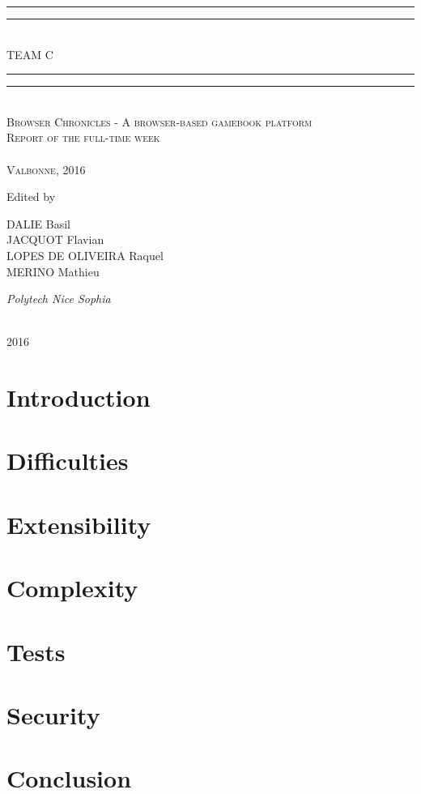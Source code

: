 \documentclass[12pt]{book}
\newcommand*{\titleGP}{\begingroup %
\centering %
\vspace*{\baselineskip} %

\rule{\textwidth}{1.6pt}\vspace*{-\baselineskip}\vspace*{2pt} %
\rule{\textwidth}{0.4pt}\\[\baselineskip] %

{\LARGE TEAM C}\\[0.2\baselineskip] %

\rule{\textwidth}{0.4pt}\vspace*{-\baselineskip}\vspace{3.2pt} %
\rule{\textwidth}{1.6pt}\\[\baselineskip] %

\scshape %
Browser Chronicles - A browser-based gamebook platform \\ %
Report of the full-time week \\
 \\[\baselineskip] %
Valbonne,  2016\par %

\vspace*{2\baselineskip} %

Edited by \\[\baselineskip]
{\Large DALIE Basil \\ JACQUOT Flavian\\LOPES DE OLIVEIRA Raquel \\ MERINO Mathieu
\par} %
{\itshape Polytech Nice Sophia \par} %

\vfill %

\plogo \\[0.3\baselineskip] %
{\scshape 2016} \\[0.3\baselineskip] %

\endgroup}
\begin{document}
 
\titleGP

\begingroup
\let\cleardoublepage\clearpage
\renewcommand{\contentsname}{Summary}
\tableofcontents
\endgroup


\newpage
\section{Introduction}


\newpage
\section{Difficulties}


\section{Extensibility}


\section{Complexity}


\section{Tests}


\section{Security}


\newpage
\section{Conclusion}

    
\end{document}
